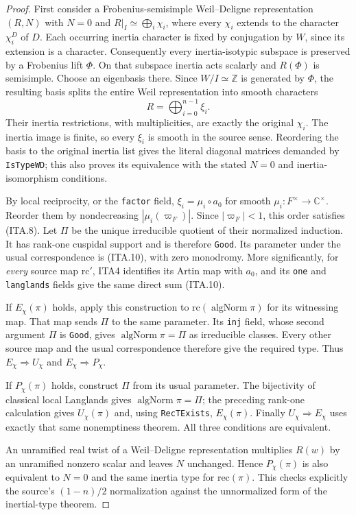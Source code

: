 \documentclass[11pt,a4paper]{article}
\numberwithin{equation}{section}
\theoremstyle{remark}\newtheorem{remark}[theorem]{Remark}
\begin{document}
\begin{proof}
First consider a Frobenius-semisimple Weil--Deligne
representation $(R,N)$ with $N=0$ and
$R|_I\simeq\bigoplus_i\chi_i$, where every $\chi_i$
extends to the character $\chi_i^D$ of $D$.
Each occurring inertia character is fixed by conjugation
by $W$, since its extension is a character.  Consequently
every inertia-isotypic subspace is preserved by a
Frobenius lift $\Phi$.  On that subspace inertia acts
scalarly and $R(\Phi)$ is semisimple.  Choose an eigenbasis
there.  Since $W/I\simeq\mathbb Z$ is generated by
$\Phi$, the resulting basis splits the entire Weil
representation into smooth characters
\[
                            R=\bigoplus_{i=0}^{n-1}\xi_i.
                                                               \tag{ITA.10}
\]
Their inertia restrictions, with multiplicities, are exactly
the original $\chi_i$.  The inertia image is finite, so
every $\xi_i$ is smooth in the source sense.  Reordering
the basis to the original inertia list gives the literal
diagonal matrices demanded by \texttt{Is\allowbreak Type\allowbreak WD}; this
also proves its equivalence with the stated $N=0$
and inertia-isomorphism conditions.

By local reciprocity, or the \texttt{factor} field,
$\xi_i=\mu_i\circ a_0$ for smooth $\mu_i:F^\times\to
\mathbb C^\times$.  Reorder them by nondecreasing
$|\mu_i(\varpi_F)|$.  Since $|\varpi_F|<1$, this order
satisfies (ITA.8).  Let $\Pi$ be the unique irreducible
quotient of their normalized induction.  It has rank-one
cuspidal support and is therefore \texttt{Good}.  Its
parameter under the usual correspondence is (ITA.10),
with zero monodromy.  More significantly, for \emph{every}
source map $\mathrm{rc}'$, ITA4 identifies its Artin map
with $a_0$, and its \texttt{one} and \texttt{langlands}
fields give the same direct sum (ITA.10).

If $E_\chi(\pi)$ holds, apply this construction to
$\mathrm{rc}(\operatorname{algNorm}\pi)$ for its witnessing
map.  That map sends $\Pi$ to the same parameter.  Its
\texttt{inj} field, whose second argument $\Pi$ is
\texttt{Good}, gives
$\operatorname{algNorm}\pi=\Pi$ as irreducible classes.
Every other source map and the usual correspondence
therefore give the required type.  Thus
$E_\chi\Rightarrow U_\chi$ and $E_\chi\Rightarrow P_\chi$.

If $P_\chi(\pi)$ holds, construct $\Pi$ from its usual
parameter.  The bijectivity of classical local Langlands
gives $\operatorname{algNorm}\pi=\Pi$; the preceding
rank-one calculation gives $U_\chi(\pi)$ and, using
\texttt{Rec\allowbreak TExists}, $E_\chi(\pi)$.  Finally
$U_\chi\Rightarrow E_\chi$ uses exactly that same
nonemptiness theorem.  All three conditions are equivalent.

An unramified real twist of a Weil--Deligne representation
multiplies $R(w)$ by an unramified nonzero scalar and leaves
$N$ unchanged.  Hence $P_\chi(\pi)$ is also equivalent to
$N=0$ and the same inertia type for $\mathrm{rec}(\pi)$.
This checks explicitly the source's $(1-n)/2$ normalization
against the unnormalized form of the inertial-type theorem.
\end{proof}
\end{document}

